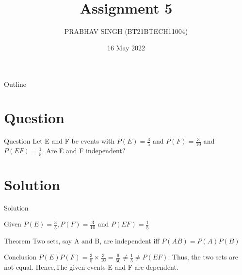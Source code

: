 \documentclass{beamer}
\title{Assignment 5}
\author{PRABHAV SINGH (BT21BTECH11004)}
\date{16 May 2022}
\begin{document}
	
	\begin{frame}
		\titlepage 
	\end{frame}
	
	\logo{}
	
	
	\begin{frame}{Outline}
		\tableofcontents
	\end{frame}
	
	\section{Question}
	\begin{frame}{Question}
		Let E and F be events with $P(E) = \frac{3}{5}$ and $P(F) = \frac{3}{10}$ and $P(EF) = \frac{1}{5}$. Are E and F independent?
		
	\end{frame}
	
	
	\section{Solution}
	\begin{frame}{Solution}
		\begin{block}{Given}
			$P(E) = \frac{3}{5},
			P(F) = \frac{3}{10} \text{ and } 
			P(EF) = \frac{1}{5}$
		\end{block}
	\begin{exampleblock}{Theorem}
		Two sets, say A and B, are independent iff $P(AB) = P(A)P(B)$
	\end{exampleblock}
	\begin{block}{Conclusion}
		$P(E)P(F) = \frac{3}{5} \times \frac{3}{10} =   \frac{9}{50} \neq \frac{1}{5} \neq P(EF)$.
		Thus, the two sets are not equal. Hence,The given events E and F are dependent.
	\end{block}
\end{frame} 
\end{document}

